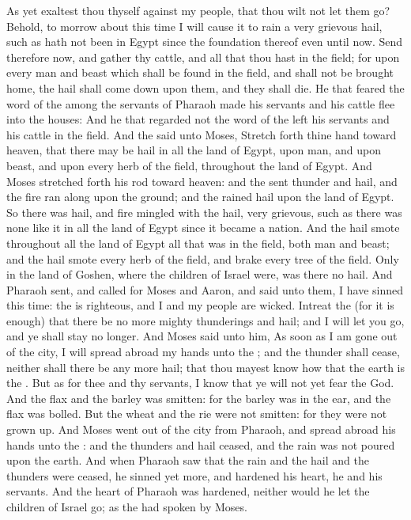 \begin{biblechapter}
\verse As yet exaltest thou thyself against my people, that thou wilt not let them go?
\verse Behold, to morrow about this time I will cause it to rain a very grievous hail, such as hath not been in Egypt since the foundation thereof even until now.
\verse Send therefore now, and gather thy cattle, and all that thou hast in the field; for upon every man and beast which shall be found in the field, and shall not be brought home, the hail shall come down upon them, and they shall die.
\verse He that feared the word of the \LORD among the servants of Pharaoh made his servants and his cattle flee into the houses:
\verse And he that regarded not the word of the \LORD left his servants and his cattle in the field.
\verse And the \LORD said unto Moses, Stretch forth thine hand toward heaven, that there may be hail in all the land of Egypt, upon man, and upon beast, and upon every herb of the field, throughout the land of Egypt.
\verse And Moses stretched forth his rod toward heaven: and the \LORD sent thunder and hail, and the fire ran along upon the ground; and the \LORD rained hail upon the land of Egypt.
\verse So there was hail, and fire mingled with the hail, very grievous, such as there was none like it in all the land of Egypt since it became a nation.
\verse And the hail smote throughout all the land of Egypt all that was in the field, both man and beast; and the hail smote every herb of the field, and brake every tree of the field.
\verse Only in the land of Goshen, where the children of Israel were, was there no hail.
\verse And Pharaoh sent, and called for Moses and Aaron, and said unto them, I have sinned this time: the \LORD is righteous, and I and my people are wicked.
\verse Intreat the \LORD (for it is enough) that there be no more mighty thunderings and hail; and I will let you go, and ye shall stay no longer.
\verse And Moses said unto him, As soon as I am gone out of the city, I will spread abroad my hands unto the \LORD; and the thunder shall cease, neither shall there be any more hail; that thou mayest know how that the earth is the \LORDs.
\verse But as for thee and thy servants, I know that ye will not yet fear the \LORD God.
\verse And the flax and the barley was smitten: for the barley was in the ear, and the flax was bolled.
\verse But the wheat and the rie were not smitten: for they were not grown up.
\verse And Moses went out of the city from Pharaoh, and spread abroad his hands unto the \LORD: and the thunders and hail ceased, and the rain was not poured upon the earth.
\verse And when Pharaoh saw that the rain and the hail and the thunders were ceased, he sinned yet more, and hardened his heart, he and his servants.
\verse And the heart of Pharaoh was hardened, neither would he let the children of Israel go; as the \LORD had spoken by Moses.
\end{biblechapter}

